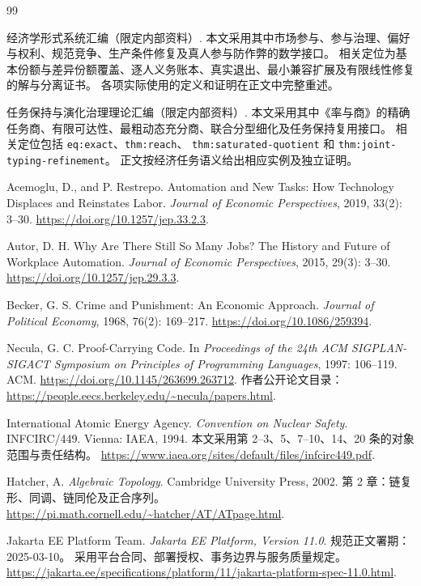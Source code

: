 \documentclass[UTF8,12pt,a4paper,openany,fontset=none,zihao=false]{ctexrep}
\theoremstyle{definition}
\newcommand{\1}{\mathbf 1}
\begin{document}
\cleardoublepage
{}
\begin{thebibliography}{99}

经济学形式系统汇编（限定内部资料）.
本文采用其中市场参与、参与治理、偏好与权利、规范竞争、生产条件修复及真人参与防作弊的数学接口。
相关定位为基本份额与差异份额覆盖、逐人义务账本、真实退出、最小兼容扩展及有限线性修复的解与分离证书。
各项实际使用的定义和证明在正文中完整重述。

任务保持与演化治理理论汇编（限定内部资料）.
本文采用其中《率与商》的精确任务商、有限可达性、最粗动态充分商、联合分型细化及任务保持复用接口。
相关定位包括 \texttt{eq:exact}、\texttt{thm:reach}、
\texttt{thm:saturated-quotient} 和 \texttt{thm:joint-typing-refinement}。
正文按经济任务语义给出相应实例及独立证明。

Acemoglu, D., and P. Restrepo.
Automation and New Tasks: How Technology Displaces and Reinstates Labor.
\emph{Journal of Economic Perspectives}, 2019, 33(2): 3--30.
\url{https://doi.org/10.1257/jep.33.2.3}.

Autor, D. H.
Why Are There Still So Many Jobs? The History and Future of Workplace Automation.
\emph{Journal of Economic Perspectives}, 2015, 29(3): 3--30.
\url{https://doi.org/10.1257/jep.29.3.3}.

Becker, G. S.
Crime and Punishment: An Economic Approach.
\emph{Journal of Political Economy}, 1968, 76(2): 169--217.
\url{https://doi.org/10.1086/259394}.

Necula, G. C.
Proof-Carrying Code.
In \emph{Proceedings of the 24th ACM SIGPLAN-SIGACT Symposium on Principles of Programming Languages},
1997: 106--119. ACM.
\url{https://doi.org/10.1145/263699.263712}.
作者公开论文目录：\url{https://people.eecs.berkeley.edu/~necula/papers.html}.

International Atomic Energy Agency.
\emph{Convention on Nuclear Safety}.
INFCIRC/449. Vienna: IAEA, 1994.
本文采用第 2--3、5、7--10、14、20 条的对象范围与责任结构。
\url{https://www.iaea.org/sites/default/files/infcirc449.pdf}.

Hatcher, A.
\emph{Algebraic Topology}.
Cambridge University Press, 2002.
第 2 章：链复形、同调、链同伦及正合序列。
\url{https://pi.math.cornell.edu/~hatcher/AT/ATpage.html}.

Jakarta EE Platform Team.
\emph{Jakarta EE Platform, Version 11.0}.
规范正文署期：2025-03-10。
采用平台合同、部署授权、事务边界与服务质量规定。
\url{https://jakarta.ee/specifications/platform/11/jakarta-platform-spec-11.0.html}.


\end{thebibliography}
\end{document}
